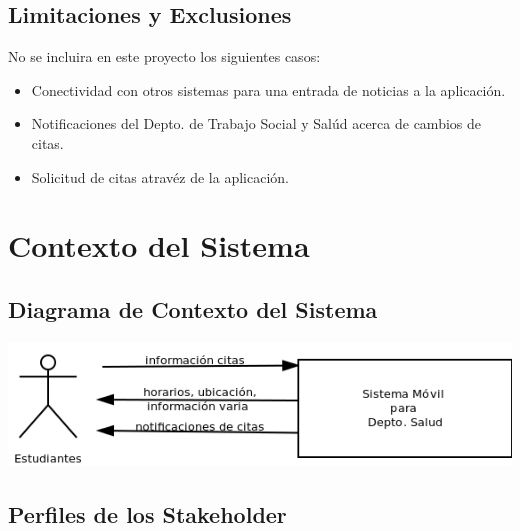 \documentclass[12pt]{article}
\begin{document}
\subsection{Limitaciones y Exclusiones}

No se incluira en este proyecto los siguientes casos:

\begin{itemize}
	\item{Conectividad con otros sistemas para una entrada de noticias a la aplicaci\'on.}
	\item{Notificaciones del Depto. de Trabajo Social y Sal\'ud acerca de cambios de citas.}
	\item{Solicitud de citas atrav\'ez de la aplicaci\'on.}
\end{itemize}

\section{Contexto del Sistema}

\subsection{Diagrama de Contexto del Sistema}

\includegraphics[width=\linewidth]{"Diagramas/diagrama contexto"}

\subsection{Perfiles de los Stakeholder}
\end{document}
